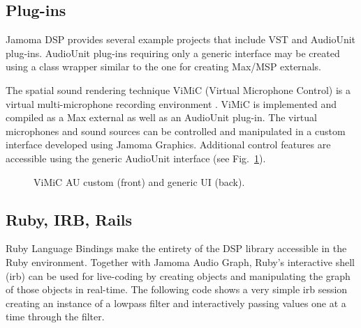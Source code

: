 \documentclass[twoside,10pt]{article}
\begin{document}
\subsection{Plug-ins}

Jamoma DSP provides several example projects that include VST and AudioUnit plug-ins.  AudioUnit plug-ins requiring only a generic interface may be created using a class wrapper similar to the one for creating Max/MSP externals.  

The spatial sound rendering technique ViMiC (Virtual Microphone Control) is a virtual multi-microphone recording environment \cite{CMJ08-VIMIC}.  ViMiC is implemented and compiled as a Max external as well as an AudioUnit plug-in. The virtual microphones and sound sources can be controlled and manipulated in a custom interface developed using Jamoma Graphics.  Additional control features are accessible using the generic AudioUnit interface (see Fig.~\ref{fig:vimic}).


\begin{figure}[hb]
\centerline{}
\caption{ViMiC AU custom (front) and generic UI (back).}
\label{fig:vimic}
\end{figure}


\subsection{Ruby, IRB, Rails}
Ruby Language Bindings make the entirety of the DSP library accessible in the Ruby environment.  Together with Jamoma Audio Graph, Ruby's interactive shell (irb) can be used for live-coding by creating objects and manipulating the graph of those objects in real-time.  The following code shows a very simple irb session creating an instance of a lowpass filter and interactively passing values one at a time through the filter.
\end{document}
